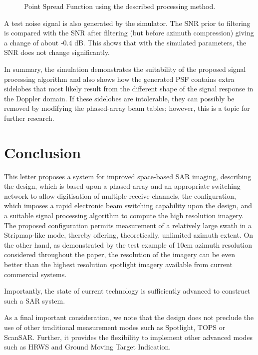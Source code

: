 \documentclass[journal]{IEEEtran}
\begin{document}
\begin{figure}[h!]
\begin{center}
 \resizebox{\columnwidth}{!}{}
 \caption{Point Spread Function using the described processing method.}
 \label{fg:psf}
 \end{center}
\end{figure}
\par
A test noise signal is also generated by the simulator. The SNR prior to filtering is compared with the SNR after filtering (but before azimuth compression) giving a change of about -0.4 dB. This shows that with the simulated parameters, the SNR does not change significantly.
\par
In summary, the simulation demonstrates the suitability of the proposed signal processing algorithm and also shows how the generated PSF contains extra sidelobes that most likely result from the different shape of the signal response in the Doppler domain. If these sidelobes are intolerable, they can possibly be removed by modifying the phased-array beam tables; however, this is a topic for further research.
\section{Conclusion}
This letter proposes a system for improved space-based SAR imaging, describing the design, which is based upon a phased-array and an appropriate switching network to allow digitisation of multiple receive channels, the configuration, which imposes a rapid electronic beam switching capability upon the design, and a suitable signal processing algorithm to compute the high resolution imagery. The proposed configuration permits measurement of a relatively large swath in a Stripmap-like mode, thereby offering, theoretically, unlimited azimuth extent. On the other hand, as demonstrated by the test example of 10cm azimuth resolution considered throughout the paper, the resolution of the imagery can be even better than the highest resolution spotlight imagery available from current commercial systems.
\par
Importantly, the state of current technology is sufficiently advanced to construct such a SAR system.
\par
As a final important consideration, we note that the design does not preclude the use of other traditional measurement modes such as Spotlight, TOPS or ScanSAR. Further, it provides the flexibility to implement other advanced modes such as HRWS and Ground Moving Target Indication.
%



\end{document}
